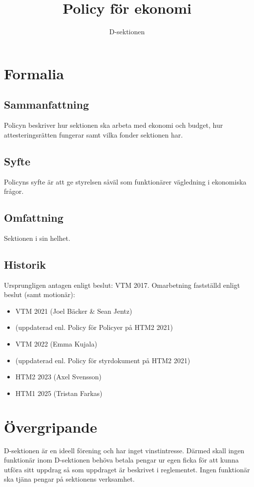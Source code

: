 \documentclass{dsekprotokoll}
\title{Policy för ekonomi}
\author{D-sektionen}
\begin{document}
\maketitle
\section{Formalia}
\subsection{Sammanfattning}
Policyn beskriver hur sektionen ska arbeta med ekonomi och budget, hur
attesteringsrätten fungerar samt vilka fonder sektionen har.

\subsection{Syfte}
Policyns syfte är att ge styrelsen såväl som funktionärer vägledning i
ekonomiska frågor.

\subsection{Omfattning}
Sektionen i sin helhet.

\subsection{Historik}
Ursprungligen antagen enligt beslut: VTM 2017.
Omarbetning fastställd enligt beslut (samt motionär):
\begin{itemize}
  \item VTM 2021 (Joel Bäcker \& Sean Jentz)
  \item (uppdaterad enl. Policy för Policyer på HTM2 2021)
  \item VTM 2022 (Emma Kujala)
  \item (uppdaterad enl. Policy för styrdokument på HTM2 2021)
  \item HTM2 2023 (Axel Svensson)
  \item HTM1 2025 (Tristan Farkas)
\end{itemize}

\section{Övergripande}
D-sektionen är en ideell förening och har inget vinstintresse. Därmed skall
ingen funktionär inom D-sektionen behöva betala pengar ur egen ficka för att
kunna utföra sitt uppdrag så som uppdraget är beskrivet i reglementet. Ingen
funktionär ska tjäna pengar på sektionens verksamhet.
\end{document}
